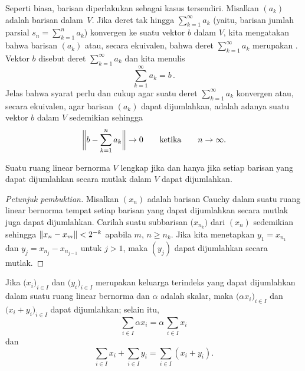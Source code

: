 \begin{defn}
Seperti biasa, barisan diperlakukan sebagai kasus tersendiri.  Misalkan $(a_k)$ adalah barisan dalam~$V$.  Jika deret tak hingga
$\sum_{k=1}^\infty a_k$ (yaitu, barisan
jumlah parsial $s_n = \sum_{k=1}^n a_k$) konvergen ke suatu
vektor $b$ dalam $V$, kita mengatakan bahwa barisan $(a_k)$
 atau, secara ekuivalen, bahwa deret $\sum_{k=1}^\infty a_k$ merupakan
.  Vektor $b$ disebut
 deret $\sum_{k=1}^\infty a_k$ dan kita menulis
  \[ \sum_{k=1}^\infty a_k = b\,. \]
Jelas bahwa syarat perlu dan cukup agar suatu deret $\sum_{k=1}^\infty a_k$
konvergen atau, secara ekuivalen, agar barisan $(a_k)$ dapat dijumlahkan, adalah adanya suatu
vektor $b$ dalam $V$ sedemikian sehingga
  \begin{equation}\label{cond_ser_conv}
     \biggnorm{b - \sum_{k=1}^n a_k} \sto 0 \qquad \text{ketika} \qquad n \sto \infty.
  \end{equation}
\end{defn}

\begin{prop}\label{prop_abs_sum_implies_sum} Suatu ruang linear bernorma $V$ lengkap jika dan hanya jika setiap barisan yang
dapat dijumlahkan secara mutlak dalam $V$ dapat dijumlahkan.
\end{prop}

\begin{proof}[\emph{Petunjuk pembuktian}] Misalkan $(x_n)$ adalah barisan Cauchy dalam suatu ruang linear bernorma tempat setiap barisan yang
dapat dijumlahkan secara mutlak juga dapat dijumlahkan.  Carilah suatu subbarisan $\bigl(x_{n_k}\bigr)$ dari $(x_n)$ sedemikian sehingga $\lVert x_n - x_m\rVert < 2^{-k}$
apabila $m$, $n \ge n_k$.  Jika kita menetapkan $y_1 = x_{n_1}$ dan $y_j = x_{n_j} - x_{n_{j-1}}$ untuk $j > 1$, maka $(y_j)$
dapat dijumlahkan secara mutlak.   \ns
\end{proof}

\begin{prop} Jika $\bigl(x_i\bigr)_{i \in I}$ dan $\bigl(y_i\bigr)_{i \in I}$ merupakan
keluarga terindeks yang dapat dijumlahkan dalam suatu ruang linear bernorma dan $\alpha$ adalah skalar, maka
$\bigl(\alpha x_i\bigr)_{i \in I}$ dan $\bigl(x_i + y_i\bigr)_{i \in I}$
dapat dijumlahkan; selain itu,
  \[ \sum_{i \in I} \alpha x_i = \alpha \, \sum_{i \in I} x_i \]
dan
  \[ \sum_{i \in I} x_i + \sum_{i \in I} y_i =
                         \sum_{i \in I} (x_i + y_i). \]
\end{prop}

